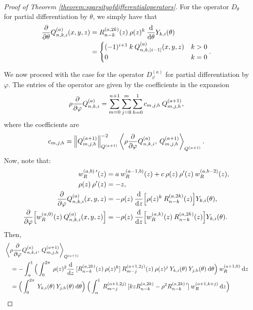 \documentclass[11pt, oneside]{article}   	%
\begin{document}
\begin{proof}[Proof of Theorem \ref{theorem:sparsityofdifferentialoperators}]

For the operator $D_\theta$ for partial differentiation by $\theta$, we simply have that
\begin{align*}
	{\partial \over \partial \theta} Q_{n,k,i}^{(a)}(x,y,z) &= R_{n-k}^{(a,2k)}(z) \: \rho(z)^{k} \: {{\rm d} \over {\rm d} \theta} Y_{k,i}(\theta) \\
	&= 
	\begin{cases}
		(-1)^{i+1} \: k \: Q^{(a)}_{n,k,|i-1|}(x,y,z) & k > 0 \\
		0 & k = 0
	\end{cases}.
\end{align*}

We now proceed with the case for the operator $D_\varphi^{(a)}$ for partial differentiation by $\varphi$. The entries of the operator are given by the coefficients in the expansion 
$$
\rho {\partial \over \partial \varphi} Q_{n,k,i}^{(a)} = \sum_{m=0}^{n+1} \sum_{j=0}^m \sum_{h=0}^1 c_{m,j,h} \: Q_{m,j,h}^{(a+1)},
$$ 
where the coefficients are 
\begin{align*}
	c_{m,j,h} = \norm{\scopmjh^{(a+1)}}^{-2}_{\scop^{(a+1)}} \ip<\rhoppphi \scopnkia, \: \scopmjh^{(a+1)}>_{\scop^{(a+1)}}.
\end{align*}
Now, note that:
\begin{align*}
	w_R^{(a,b) \: \prime}(z) &= a \: w_R^{(a-1,b)}(z) + c \: \rho(z) \: \rho'(z) \:w_R^{(a,b-2)}(z), \\
	\rho(z) \: \rho'(z) &= -z, \\
	{\partial \over \partial \varphi} Q_{n,k,i}^{(a)}(x,y,z) &= -\rho(z) \: {{\rm d} \over {\rm d} z} \Big[ \rho(z)^k \: R_{n-k}^{(a,2k)}(z) \Big] Y_{k,i}(\theta), \\
	{\partial \over \partial \varphi} \Big[ w_R^{(a,0)}(z) \: Q_{n,k,i}^{(a)}(x,y,z) \Big] &= -\rho(z) \: {{\rm d} \over {\rm d} z} \Big[ w_R^{(a,k)}(z) \: R_{n-k}^{(a,2k)}(z) \Big] Y_{k,i}(\theta).
\end{align*}
Then, 
\begin{align*}
	&\ip<\rhoppphi \scopnkia, \: \scopmjh^{(a+1)}>_{\scop^{(a+1)}} \\
	&\quad = - \int_\alpha^1 \Big( \int_0^{2\pi} \: \rho(z)^2 \ddz \: [\genjacnmk^{(a,2k)}(z) \: \rho(z)^k] \: \genjacmmj^{(a+1,2j)}(z) \: \rho(z)^j \: \chki(\theta) \: \chjh(\theta) \: \D \theta \Big) \: \genjacw^{(a+1, 0)} \: \D z \\
	&\quad = \Big( \int_0^{2\pi} \: \chki(\theta) \: \chjh(\theta) \: \D \theta \Big) \: \Big( \int_\alpha^1 \: \genjacmmj^{(a+1,2j)} \: [k z \genjacnmk^{(a, 2k)} - \rho^2 \genjacnmk^{(a, 2k) \: \prime}] \: \genjacw^{(a+1, k + j)} \: \D z \Big) \\

\end{align*}
\end{proof}
\end{document}
